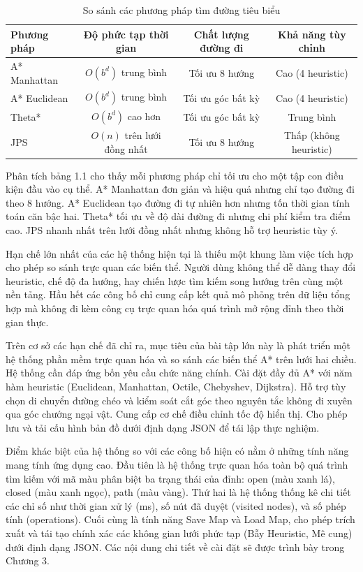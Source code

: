\documentclass[../BTL.tex]{subfiles}
\begin{document}
\begin{table}[h]
\centering
\caption{So sánh các phương pháp tìm đường tiêu biểu}
\label{table:1.1}
\begin{tabular}{|l|c|c|c|}
\hline
\textbf{Phương pháp} & \textbf{Độ phức tạp thời gian} & \textbf{Chất lượng đường đi} & \textbf{Khả năng tùy chỉnh} \\
\hline
A* Manhattan & \(O(b^d)\) trung bình & Tối ưu 8 hướng & Cao (4 heuristic) \\
\hline
A* Euclidean & \(O(b^d)\) trung bình & Tối ưu góc bất kỳ & Cao (4 heuristic) \\
\hline
Theta* & \(O(b^d)\) cao hơn & Tối ưu góc bất kỳ & Trung bình \\
\hline
JPS & \(O(n)\) trên lưới đồng nhất & Tối ưu 8 hướng & Thấp (không heuristic) \\
\hline
\end{tabular}
\end{table}

Phân tích bảng 1.1 cho thấy mỗi phương pháp chỉ tối ưu cho một tập con điều kiện đầu vào cụ thể. A* Manhattan đơn giản và hiệu quả nhưng chỉ tạo đường đi theo 8 hướng. A* Euclidean tạo đường đi tự nhiên hơn nhưng tốn thời gian tính toán căn bậc hai. Theta* tối ưu về độ dài đường đi nhưng chi phí kiểm tra điểm cao. JPS nhanh nhất trên lưới đồng nhất nhưng không hỗ trợ heuristic tùy ý.

Hạn chế lớn nhất của các hệ thống hiện tại là thiếu một khung làm việc tích hợp cho phép so sánh trực quan các biến thể. Người dùng không thể dễ dàng thay đổi heuristic, chế độ đa hướng, hay chiến lược tìm kiếm song hướng trên cùng một nền tảng. Hầu hết các công bố chỉ cung cấp kết quả mô phỏng trên dữ liệu tổng hợp mà không đi kèm công cụ trực quan hóa quá trình mở rộng đỉnh theo thời gian thực.

Trên cơ sở các hạn chế đã chỉ ra, mục tiêu của bài tập lớn này là phát triển một hệ thống phần mềm trực quan hóa và so sánh các biến thể A* trên lưới hai chiều. Hệ thống cần đáp ứng bốn yêu cầu chức năng chính. Cài đặt đầy đủ A* với năm hàm heuristic (Euclidean, Manhattan, Octile, Chebyshev, Dijkstra). Hỗ trợ tùy chọn di chuyển đường chéo và kiểm soát cắt góc theo nguyên tắc không đi xuyên qua góc chướng ngại vật. Cung cấp cơ chế điều chỉnh tốc độ hiển thị. Cho phép lưu và tải cấu hình bản đồ dưới định dạng JSON để tái lập thực nghiệm.

Điểm khác biệt của hệ thống so với các công bố hiện có nằm ở những tính năng mang tính ứng dụng cao. Đầu tiên là hệ thống trực quan hóa toàn bộ quá trình tìm kiếm với mã màu phân biệt ba trạng thái của đỉnh: open (màu xanh lá), closed (màu xanh ngọc), path (màu vàng). Thứ hai là hệ thống thống kê chi tiết các chỉ số như thời gian xử lý (ms), số nút đã duyệt (visited nodes), và số phép tính (operations). Cuối cùng là tính năng Save Map và Load Map, cho phép trích xuất và tái tạo chính xác các không gian lưới phức tạp (Bẫy Heuristic, Mê cung) dưới định dạng JSON. Các nội dung chi tiết về cài đặt sẽ được trình bày trong Chương 3.
\end{document}
